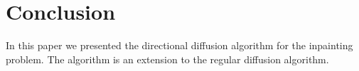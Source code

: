 \section{Conclusion}
\label{sec:conclusion}

In this paper we presented the directional diffusion algorithm for the inpainting problem. The algorithm is an extension to the regular diffusion algorithm. 


